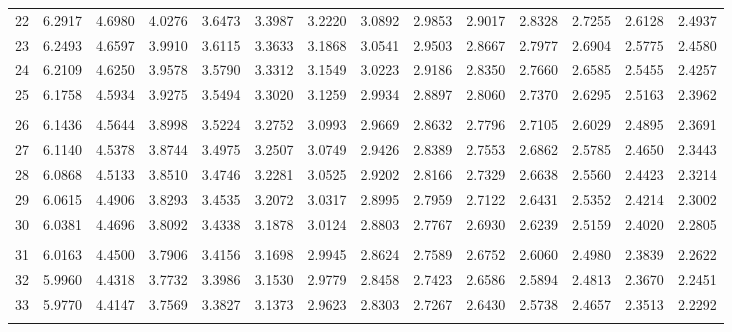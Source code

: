 {\begin{tabular}{l|lllllllllllll}
 22 & 6.2917 & 4.6980 & 4.0276 & 3.6473 & 3.3987 & 3.2220 & 3.0892 & 2.9853 & 2.9017 & 2.8328 & 2.7255 & 2.6128 & 2.4937 \\[5pt] \arrayrulecolor{light-gray}\hline\arrayrulecolor{black}  
 23 & 6.2493 & 4.6597 & 3.9910 & 3.6115 & 3.3633 & 3.1868 & 3.0541 & 2.9503 & 2.8667 & 2.7977 & 2.6904 & 2.5775 & 2.4580 \\[5pt] \arrayrulecolor{light-gray}\hline\arrayrulecolor{black}  
 24 & 6.2109 & 4.6250 & 3.9578 & 3.5790 & 3.3312 & 3.1549 & 3.0223 & 2.9186 & 2.8350 & 2.7660 & 2.6585 & 2.5455 & 2.4257 \\[5pt] \arrayrulecolor{light-gray}\hline\arrayrulecolor{black}  
 25 & 6.1758 & 4.5934 & 3.9275 & 3.5494 & 3.3020 & 3.1259 & 2.9934 & 2.8897 & 2.8060 & 2.7370 & 2.6295 & 2.5163 & 2.3962 \\[5pt] \arrayrulecolor{light-gray}\hline\arrayrulecolor{black}  
\\ 
 26 & 6.1436 & 4.5644 & 3.8998 & 3.5224 & 3.2752 & 3.0993 & 2.9669 & 2.8632 & 2.7796 & 2.7105 & 2.6029 & 2.4895 & 2.3691 \\[5pt] \arrayrulecolor{light-gray}\hline\arrayrulecolor{black}  
 27 & 6.1140 & 4.5378 & 3.8744 & 3.4975 & 3.2507 & 3.0749 & 2.9426 & 2.8389 & 2.7553 & 2.6862 & 2.5785 & 2.4650 & 2.3443 \\[5pt] \arrayrulecolor{light-gray}\hline\arrayrulecolor{black}  
 28 & 6.0868 & 4.5133 & 3.8510 & 3.4746 & 3.2281 & 3.0525 & 2.9202 & 2.8166 & 2.7329 & 2.6638 & 2.5560 & 2.4423 & 2.3214 \\[5pt] \arrayrulecolor{light-gray}\hline\arrayrulecolor{black}  
 29 & 6.0615 & 4.4906 & 3.8293 & 3.4535 & 3.2072 & 3.0317 & 2.8995 & 2.7959 & 2.7122 & 2.6431 & 2.5352 & 2.4214 & 2.3002 \\[5pt] \arrayrulecolor{light-gray}\hline\arrayrulecolor{black}  
 30 & 6.0381 & 4.4696 & 3.8092 & 3.4338 & 3.1878 & 3.0124 & 2.8803 & 2.7767 & 2.6930 & 2.6239 & 2.5159 & 2.4020 & 2.2805 \\[5pt] \arrayrulecolor{light-gray}\hline\arrayrulecolor{black}  
\\ 
 31 & 6.0163 & 4.4500 & 3.7906 & 3.4156 & 3.1698 & 2.9945 & 2.8624 & 2.7589 & 2.6752 & 2.6060 & 2.4980 & 2.3839 & 2.2622 \\[5pt] \arrayrulecolor{light-gray}\hline\arrayrulecolor{black}  
 32 & 5.9960 & 4.4318 & 3.7732 & 3.3986 & 3.1530 & 2.9779 & 2.8458 & 2.7423 & 2.6586 & 2.5894 & 2.4813 & 2.3670 & 2.2451 \\[5pt] \arrayrulecolor{light-gray}\hline\arrayrulecolor{black}  
 33 & 5.9770 & 4.4147 & 3.7569 & 3.3827 & 3.1373 & 2.9623 & 2.8303 & 2.7267 & 2.6430 & 2.5738 & 2.4657 & 2.3513 & 2.2292 \\[5pt] \arrayrulecolor{light-gray}\hline\arrayrulecolor{black}  

\end{tabular}}
